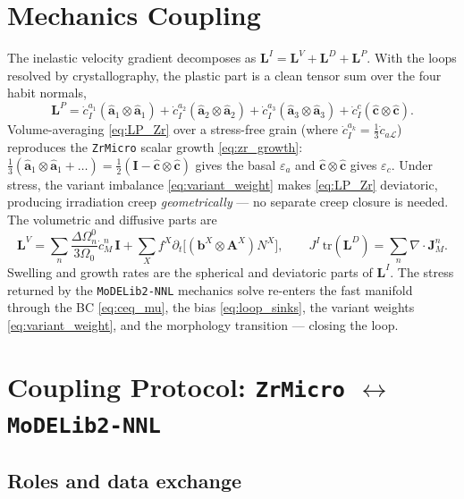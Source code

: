 \documentclass[11pt]{article}
\newcommand{\eps}{\varepsilon}
\newcommand{\Div}{\nabla\cdot}
\newcommand{\Oh}{\Omega}
\newcommand{\Lcal}{\mathcal{L}}
\newcommand{\ZrMicro}{\texttt{ZrMicro}}
\newcommand{\MoDELib}{\texttt{MoDELib2-NNL}}
\begin{document}
\section{Mechanics Coupling}
\label{sec:mechanics}

The inelastic velocity gradient decomposes as
$\mathbf L^I=\mathbf L^V+\mathbf L^D+\mathbf L^P$. With the loops resolved by
crystallography, the plastic part is a clean tensor sum over the four habit
normals,
\begin{equation}
\label{eq:LP_Zr}
    \mathbf L^P
    =
    \dot c_I^{a_1}(\hat{\mathbf a}_1\otimes\hat{\mathbf a}_1)
    +\dot c_I^{a_2}(\hat{\mathbf a}_2\otimes\hat{\mathbf a}_2)
    +\dot c_I^{a_3}(\hat{\mathbf a}_3\otimes\hat{\mathbf a}_3)
    +\dot c_I^{c}(\hat{\mathbf c}\otimes\hat{\mathbf c}).
\end{equation}
Volume-averaging \eqref{eq:LP_Zr} over a stress-free grain (where
$\dot c_I^{a_k}=\tfrac13\dot c_{a\Lcal}$) reproduces the \ZrMicro{} scalar growth
\eqref{eq:zr_growth}: $\tfrac13(\hat{\mathbf a}_1\otimes\hat{\mathbf a}_1+\dots)
=\tfrac12(\mathbf I-\hat{\mathbf c}\otimes\hat{\mathbf c})$ gives the basal
$\eps_a$ and $\hat{\mathbf c}\otimes\hat{\mathbf c}$ gives $\eps_c$. Under stress,
the variant imbalance \eqref{eq:variant_weight} makes \eqref{eq:LP_Zr}
deviatoric, producing irradiation creep \emph{geometrically} --- no separate creep
closure is needed. The volumetric and diffusive parts are
\begin{equation}
\label{eq:LVD}
    \mathbf L^V
    = \sum_n\frac{\Delta\Oh_n^0}{3\Oh_0}\dot c_M^n\,\mathbf I
    + \sum_{X}f^{X}\partial_t\big[(\mathbf b^{X}\otimes\mathbf A^{X})N^{X}\big],
    \qquad
    J^I\,\mathrm{tr}(\mathbf L^D)=\sum_n\Div\mathbf J_M^n.
\end{equation}
Swelling and growth rates are the spherical and deviatoric parts of $\mathbf L^I$.
The stress returned by the \MoDELib{} mechanics solve re-enters the fast manifold
through the BC \eqref{eq:ceq_mu}, the bias \eqref{eq:loop_sinks}, the variant
weights \eqref{eq:variant_weight}, and the morphology transition --- closing the
loop.

\section{Coupling Protocol: \texttt{ZrMicro} $\leftrightarrow$ \texttt{MoDELib2-NNL}}
\label{sec:coupling}

\subsection{Roles and data exchange}
\end{document}
